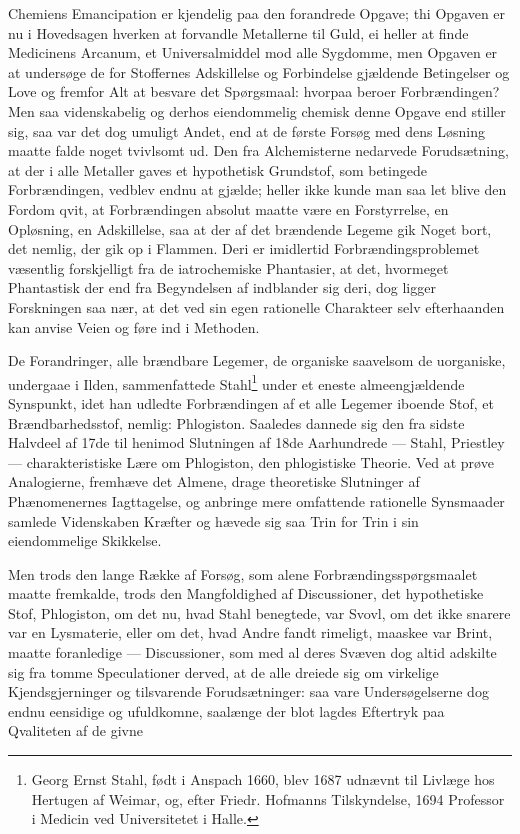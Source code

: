 \documentclass[12pt,a4paper]{book}
\begin{document}
Chemiens Emancipation er kjendelig paa den forandrede
Opgave; thi Opgaven er nu i Hovedsagen hverken at forvandle
Metallerne til Guld, ei heller at finde Medicinens
Arcanum, et Universalmiddel mod alle Sygdomme, men Opgaven
er at undersøge de for Stoffernes Adskillelse og Forbindelse
gjældende Betingelser og Love og fremfor Alt at besvare
det Spørgsmaal: hvorpaa beroer Forbrændingen? Men
saa videnskabelig og derhos eiendommelig chemisk denne
Opgave end stiller sig, saa var det dog umuligt Andet, end at
de første Forsøg med dens Løsning maatte falde noget
tvivlsomt ud. Den fra Alchemisterne nedarvede Forudsætning, at
der i alle Metaller gaves et hypothetisk Grundstof, som
betingede Forbrændingen, vedblev endnu at gjælde; heller ikke
kunde man saa let blive den Fordom qvit, at Forbrændingen
absolut maatte være en Forstyrrelse, en Opløsning, en
Adskillelse, saa at der af det brændende Legeme gik Noget bort,
\setcounter{footnote}{0}
det nemlig, der gik op i Flammen. Deri er imidlertid
Forbrændingsproblemet væsentlig forskjelligt fra de iatrochemiske
Phantasier, at det, hvormeget Phantastisk der end fra
Begyndelsen af indblander sig deri, dog ligger Forskningen saa nær,
at det ved sin egen rationelle Charakteer selv efterhaanden kan
anvise Veien og føre ind i Methoden.

De Forandringer, alle brændbare Legemer, de organiske
saavelsom de uorganiske, undergaae i Ilden, sammenfattede
Stahl\footnote{Georg Ernst Stahl, født i Anspach 1660, blev
1687 udnævnt til Livlæge hos Hertugen af Weimar, og, efter
Friedr. Hofmanns Tilskyndelse, 1694 Professor i Medicin ved
Universitetet i Halle.} under et eneste almeengjældende
Synspunkt, idet
han udledte Forbrændingen af et alle Legemer iboende Stof,
et Brændbarhedsstof, nemlig: Phlogiston. Saaledes dannede
sig den fra sidste Halvdeel af 17de til henimod Slutningen
af 18de Aarhundrede --- Stahl, Priestley --- charakteristiske
Lære om Phlogiston, den phlogistiske Theorie. Ved at prøve
Analogierne, fremhæve det Almene, drage theoretiske Slutninger
af Phænomenernes Iagttagelse, og anbringe mere
omfattende rationelle Synsmaader samlede Videnskaben Kræfter
og hævede sig saa Trin for Trin i sin eiendommelige
Skikkelse.

Men trods den lange Række af Forsøg, som alene
Forbrændingsspørgsmaalet maatte fremkalde, trods den
Mangfoldighed af Discussioner, det hypothetiske Stof, Phlogiston,
om det nu, hvad Stahl benegtede, var Svovl, om det ikke
snarere var en Lysmaterie, eller om det, hvad Andre fandt
rimeligt, maaskee var Brint, maatte foranledige --- Discussioner,
som med al deres Svæven dog altid adskilte
sig fra tomme Speculationer derved, at de alle dreiede sig
om virkelige Kjendsgjerninger og tilsvarende Forudsætninger:
saa vare Undersøgelserne dog endnu eensidige og ufuldkomne,
saalænge der blot lagdes Eftertryk paa Qvaliteten af de givne
\end{document}
